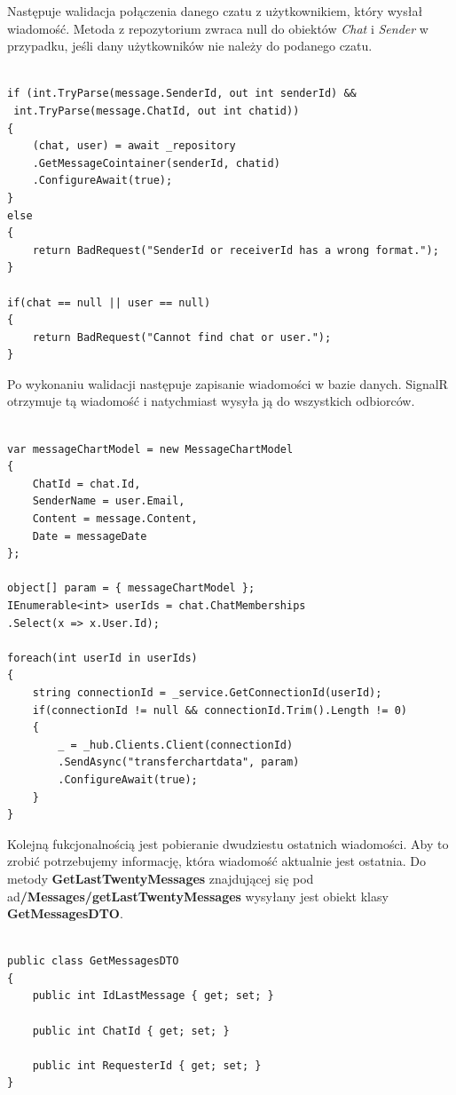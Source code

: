 \documentclass[12pt,a4paper]{article}
\begin{document}
Następuje walidacja połączenia danego czatu z użytkownikiem, który wysłał wiadomość. Metoda z repozytorium zwraca null do obiektów \textit{Chat} i \textit{Sender} w przypadku, jeśli dany użytkowników nie należy do podanego czatu. \newline

\begin{lstlisting}[caption={Walidacje wysyłania wiadomości w kontrolerze}]

if (int.TryParse(message.SenderId, out int senderId) &&
 int.TryParse(message.ChatId, out int chatid))
{
	(chat, user) = await _repository
	.GetMessageCointainer(senderId, chatid)
	.ConfigureAwait(true);
}
else
{
	return BadRequest("SenderId or receiverId has a wrong format.");
}

if(chat == null || user == null)
{
	return BadRequest("Cannot find chat or user.");
}
\end{lstlisting}

Po wykonaniu walidacji następuje zapisanie wiadomości w bazie danych. SignalR otrzymuje tą wiadomość i natychmiast wysyła ją do wszystkich odbiorców. \newline

\begin{lstlisting}[caption={Wysłanie wiadomosci za pomocą SignalR}]

var messageChartModel = new MessageChartModel
{
	ChatId = chat.Id,
	SenderName = user.Email,
	Content = message.Content,
	Date = messageDate
};

object[] param = { messageChartModel };
IEnumerable<int> userIds = chat.ChatMemberships
.Select(x => x.User.Id);

foreach(int userId in userIds)
{
	string connectionId = _service.GetConnectionId(userId);
	if(connectionId != null && connectionId.Trim().Length != 0)
	{
		_ = _hub.Clients.Client(connectionId)
		.SendAsync("transferchartdata", param)
		.ConfigureAwait(true);
	}
}
\end{lstlisting}

\hspace*{0.7cm} Kolejną fukcjonalnością jest pobieranie dwudziestu ostatnich wiadomości. Aby to zrobić potrzebujemy informację, która wiadomość aktualnie jest ostatnia. Do metody \textbf{GetLastTwentyMessages} znajdującej się pod ad\textbf{/Messages/getLastTwentyMessages} wysyłany jest obiekt klasy \textbf{GetMessagesDTO}.

\begin{lstlisting}[caption={Implementacja klasy GetMessagesDTO}]

public class GetMessagesDTO
{
	public int IdLastMessage { get; set; }
	
	public int ChatId { get; set; }
	
	public int RequesterId { get; set; }
}
\end{lstlisting}
\end{document}
